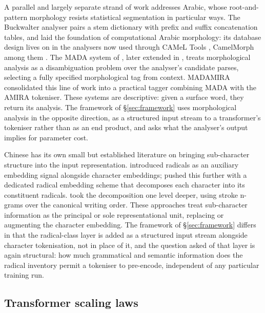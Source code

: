 A parallel and largely separate strand of work addresses Arabic, whose root-and-pattern morphology resists statistical segmentation in particular ways. The Buckwalter analyser \citep{buckwalter2004} pairs a stem dictionary with prefix and suffix concatenation tables, and laid the foundation of computational Arabic morphology: its database design lives on in the analysers now used through CAMeL Tools \citep{obeid2020camel}, CamelMorph among them \citep{khairallah2024camelmorph}. The MADA system of \citet{habash2005mada}, later extended in \citet{habash2009mada}, treats morphological analysis as a disambiguation problem over the analyser's candidate parses, selecting a fully specified morphological tag from context. MADAMIRA \citep{pasha2014madamira} consolidated this line of work into a practical tagger combining MADA with the AMIRA tokeniser. These systems are descriptive: given a surface word, they return its analysis. The framework of \S\ref{sec:framework} uses morphological analysis in the opposite direction, as a structured input stream to a transformer's tokeniser rather than as an end product, and asks what the analyser's output implies for parameter cost.

Chinese has its own small but established literature on bringing sub-character structure into the input representation. \citet{sun2014radical} introduced radicals as an auxiliary embedding signal alongside character embeddings; \citet{shi2015radical} pushed this further with a dedicated radical embedding scheme that decomposes each character into its constituent radicals. \citet{cao2018cw2vec} took the decomposition one level deeper, using stroke n-grams over the canonical writing order. These approaches treat sub-character information as the principal or sole representational unit, replacing or augmenting the character embedding. The framework of \S\ref{sec:framework} differs in that the radical-class layer is added as a structured input stream alongside character tokenisation, not in place of it, and the question asked of that layer is again structural: how much grammatical and semantic information does the radical inventory permit a tokeniser to pre-encode, independent of any particular training run.

\subsection{Transformer scaling laws}
\label{sec:related-scaling}

